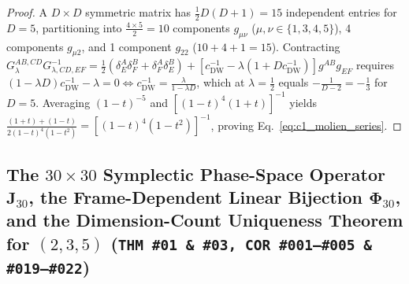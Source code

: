 \documentclass[11pt,a4paper]{article}
\theoremstyle{definition}
\theoremstyle{plain}
\theoremstyle{remark}
\begin{document}
\begin{proof}
A $D\times D$ symmetric matrix has $\frac{1}{2}D(D+1) = 15$ independent entries for $D=5$, partitioning into $\frac{4\times 5}{2} = 10$ components $g_{\mu\nu}$ ($\mu,\nu \in \{1,3,4,5\}$), 4 components $g_{\mu 2}$, and 1 component $g_{22}$ ($10+4+1=15$). Contracting $G_\lambda^{AB,CD}G_{\lambda,CD,EF}^{-1} = \frac{1}{2}(\delta^A_E\delta^B_F + \delta^A_F\delta^B_E) + [c_{\mathrm{DW}}^{-1} - \lambda(1 + D c_{\mathrm{DW}}^{-1})]g^{AB}g_{EF}$ requires $(1 - \lambda D)c_{\mathrm{DW}}^{-1} - \lambda = 0 \iff c_{\mathrm{DW}}^{-1} = \frac{\lambda}{1 - \lambda D}$, which at $\lambda = \frac{1}{2}$ equals $-\frac{1}{D-2} = -\frac{1}{3}$ for $D=5$. Averaging $(1-t)^{-5}$ and $[(1-t)^4(1+t)]^{-1}$ yields $\frac{(1+t)+(1-t)}{2(1-t)^4(1-t^2)} = [(1-t)^4(1-t^2)]^{-1}$, proving Eq.~\eqref{eq:c1_molien_series}.
\end{proof}

\subsection{\texorpdfstring{The $30\times 30$ Symplectic Phase-Space Operator $\mathbf{J}_{30}$, the Frame-Dependent Linear Bijection $\bm{\Phi}_{30}$, and the Dimension-Count Uniqueness Theorem for $(2, 3, 5)$ (\texttt{THM~\#01 \& \#03, COR~\#001--\#005 \& \#019--\#022})}{The 30x30 Symplectic Phase-Space Operator J\_30, the Frame-Dependent Linear Bijection Phi\_30, and the Dimension-Count Uniqueness Theorem for (2, 3, 5)}}
\end{document}
